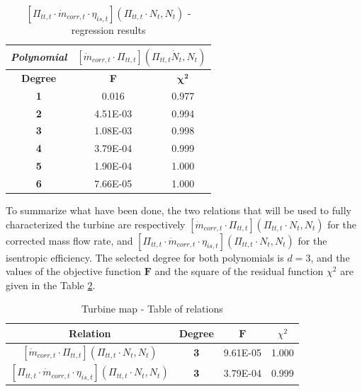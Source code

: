 \begin{longtable}[c]{ccc}
\caption{$[\Pi_{tt,t}\cdot \dot{m}_{corr,t}\cdot\eta_{is,t}](\Pi_{tt,t}\cdot N_t,N_t)$ - regression results }
\label{tab:C7_regturb5}\\
\hline
\multicolumn{1}{l}{\textit{\textbf{Polynomial}}} & \multicolumn{2}{c}{$[\dot{m}_{corr,t}\cdot \Pi_{tt,t}](\Pi_{tt,t}\dot N_t,N_t)$} \\ \hline
\endfirsthead
%
\endhead
%
\hline
\endfoot
%
\endlastfoot
%
\textbf{Degree}                                  & \multicolumn{1}{c}{\textbf{F}}      & \multicolumn{1}{c}{$\mathbf{\chi^2}$}      \\
\textbf{1}                                       & 0.016                               & 0.977                                      \\
\textbf{2}                                       & 4.51E-03                            & 0.994                                      \\
\textbf{3}                                       & 1.08E-03                            & 0.998                                      \\
\textbf{4}                                       & 3.79E-04                            & 0.999                                      \\
\textbf{5}                                       & 1.90E-04                            & 1.000                                      \\
\textbf{6}                                       & 7.66E-05                            & 1.000                                      \\ \hline
\end{longtable}

To summarize what have been done, the two relations that will be used to fully characterized the turbine are respectively $[\dot{m}_{corr,t}\cdot \Pi_{tt,t}](\Pi_{tt,t}\cdot N_t,N_t)$ for the corrected mass flow rate, and $[\Pi_{tt,t}\cdot \dot{m}_{corr,t}\cdot\eta_{is,t}](\Pi_{tt,t}\cdot N_t,N_t)$ for the isentropic efficiency. The selected degree for both polynomials is $d=3$, and the values of the objective function $\mathbf{F}$ and the square of the residual function $\chi^2$ are given in the Table \ref{tab:C7_turbmaprel}.

\begin{longtable}[c]{@{}cccc@{}}
\caption{Turbine map - Table of relations}
\label{tab:C7_turbmaprel}\\
\toprule
\multicolumn{1}{c}{\textbf{Relation}} & \multicolumn{1}{c}{\textbf{Degree}} & \multicolumn{1}{c}{$\mathbf{F}$} & \multicolumn{1}{c}{$\chi^2$} \\* \midrule
\endfirsthead
%
\endhead
%
\bottomrule
\endfoot
%
\endlastfoot
%
$[\dot{m}_{corr,t}\cdot \Pi_{tt,t}](\Pi_{tt,t}\cdot N_t,N_t)$           & \textbf{3}   & 9.61E-05                   & 1.000 \\
$[\Pi_{tt,t}\cdot \dot{m}_{corr,t}\cdot\eta_{is,t}](\Pi_{tt,t}\cdot N_t,N_t)$           & \textbf{3}   & 3.79E-04                    & 0.999        \\* \bottomrule
\end{longtable}

